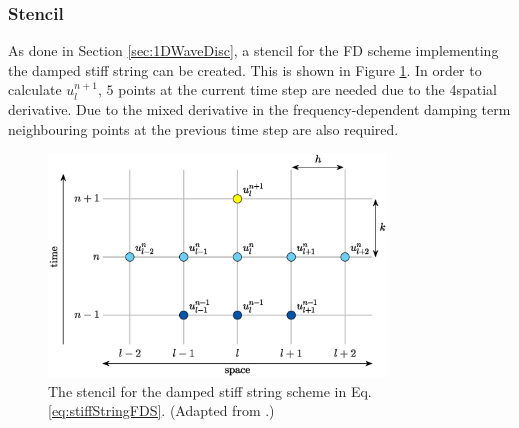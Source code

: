 \subsubsection{Stencil}
As done in Section \ref{sec:1DWaveDisc}, a stencil for the FD scheme implementing the damped stiff string can be created. This is shown in Figure \ref{fig:stencilStiffString}. In order to calculate $u_l^{n+1}$, $5$ points at the current time step are needed due to the 4\thOrder spatial derivative. Due to the mixed derivative in the frequency-dependent damping term neighbouring points at the previous time step are also required. 

\begin{figure}[h]
    \centering
    \includegraphics[width=0.8\textwidth]{figures/resonators/stencilDampedStiffString.eps}
    \caption{The stencil for the damped stiff string scheme in Eq. \eqref{eq:stiffStringFDS}. (Adapted from \citeP[A].)\label{fig:stencilStiffString}}
\end{figure}

